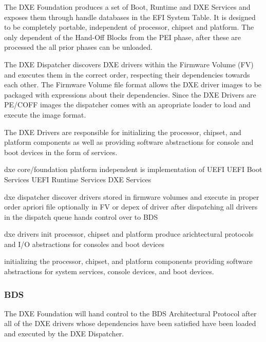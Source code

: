 The DXE Foundation produces a set of Boot, Runtime and DXE Services and exposes them through handle databases in the EFI System Table. It is designed to be completely portable, independent of processor, chipset and platform. The only dependent of the Hand-Off Blocks from the PEI phase, after these are processed the all prior phases can be unloaded.


The DXE Dispatcher discovers DXE drivers within the Firmware Volume (FV) and executes them in the correct order, respecting their dependencies towards each other. The Firmware Volume file format allows the DXE driver images to be packaged with expressions about their dependencies. Since the DXE Drivers are PE/COFF images the dispatcher comes with an apropriate loader to load and execute the image format.



The DXE Drivers are responsible for initializing the processor, chipset,
and platform components as well as providing software abstractions for console and
boot devices in the form of services.

dxe core/foundation
platform independent
is implementation of UEFI
UEFI Boot Services
UEFI Runtime Services
DXE Services

dxe dispatcher
discover drivers stored in firmware volumes and execute in proper order
apriori file optionally in FV or depex of driver
after dispatching all drivers in the dispatch queue hands control over to BDS

dxe drivers
init processor, chipset and platform
produce arichtectural protocols and \ac{I/O} abstractions for consoles and boot devices

initializing the processor, chipset, and platform components
providing software abstractions for system services, console devices, and boot devices.


\subsubsection{\acf{BDS}}
The DXE Foundation will hand control to the BDS Architectural Protocol after all of the DXE drivers whose dependencies have been satisfied have been loaded and executed by the DXE Dispatcher.

